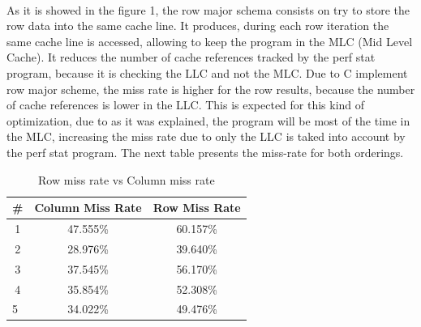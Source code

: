 \documentclass[xcolor=table]{llncs}
\begin{document}
\paragraph{}
As it is showed in the figure 1, the row major schema consists on try to store the row data into the same cache line. It produces, during each row iteration the same cache line is accessed, allowing to keep the program in the MLC (Mid Level Cache). It reduces the number of cache references tracked by the perf stat program, because it is checking the LLC and not the MLC.\newline
Due to C implement row major scheme, the miss rate is higher for the row results, because the number of cache references is lower in the LLC. This is expected for this kind of optimization, due to as it was explained, the program will be most of the time in the MLC, increasing the miss rate due to only the LLC is taked into account by the perf stat program.
The next table presents the miss-rate for both orderings.
\begin{table}[]
\centering
\caption{Row miss rate vs Column miss rate}
\label{table4}
\begin{tabular}{ccc}
\hline
\rowcolor[HTML]{000000} 
{\color[HTML]{FFFFFF} \textbf{\#}} & {\color[HTML]{FFFFFF} \textbf{Column Miss Rate}} & {\color[HTML]{FFFFFF} \textbf{Row Miss Rate}} \\ \hline
1                                  & 47.555\%                                         & 60.157\%                                      \\
2                                  & 28.976\%                                         & 39.640\%                                      \\
3                                  & 37.545\%                                         & 56.170\%                                      \\
4                                  & 35.854\%                                         & 52.308\%                                      \\
\multicolumn{1}{l}{5}              & 34.022\%                                         & 49.476\%                                      \\ \hline
\end{tabular}
\end{table}
\newline
\newline
\newline
\end{document}

